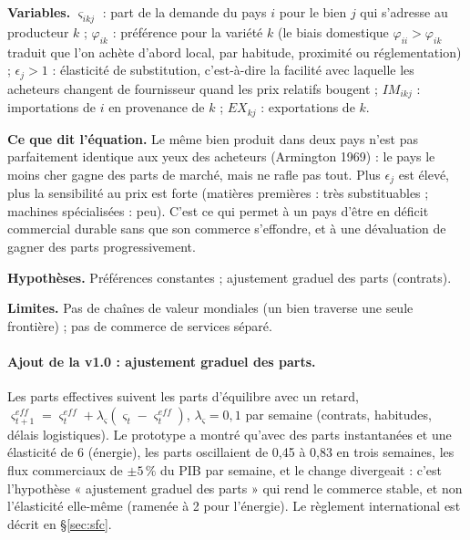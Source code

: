 \documentclass[11pt,a4paper]{article}
\newcommand{\variables}{\par\noindent\textbf{Variables.} }
\newcommand{\sens}{\par\noindent\textbf{Ce que dit l'équation.} }
\newcommand{\hyp}{\par\noindent\textbf{Hypothèses.} }
\newcommand{\limites}{\par\noindent\textbf{Limites.} }
\begin{document}
\begin{lecture}
\variables $\varsigma_{ikj}$ : part de la demande du pays $i$ pour le bien $j$ qui s'adresse au producteur $k$ ; $\varphi_{ik}$ : préférence pour la variété $k$ (le biais domestique $\varphi_{ii}>\varphi_{ik}$ traduit que l'on achète d'abord local, par habitude, proximité ou réglementation) ; $\epsilon_j>1$ : élasticité de substitution, c'est-à-dire la facilité avec laquelle les acheteurs changent de fournisseur quand les prix relatifs bougent ; $IM_{ikj}$ : importations de $i$ en provenance de $k$ ; $EX_{kj}$ : exportations de $k$.
\sens Le même bien produit dans deux pays n'est pas parfaitement identique aux yeux des acheteurs (Armington 1969) : le pays le moins cher gagne des parts de marché, mais ne rafle pas tout. Plus $\epsilon_j$ est élevé, plus la sensibilité au prix est forte (matières premières : très substituables ; machines spécialisées : peu). C'est ce qui permet à un pays d'être en déficit commercial durable sans que son commerce s'effondre, et à une dévaluation de gagner des parts progressivement.
\hyp Préférences constantes ; ajustement graduel des parts (contrats).
\limites Pas de chaînes de valeur mondiales (un bien traverse une seule frontière) ; pas de commerce de services séparé.
\paragraph{Ajout de la v1.0 : ajustement graduel des parts.} Les parts effectives suivent les parts d'équilibre avec un retard, $\varsigma^{eff}_{t+1}=\varsigma^{eff}_t+\lambda_\varsigma(\varsigma_t-\varsigma^{eff}_t)$, $\lambda_\varsigma=0{,}1$ par semaine (contrats, habitudes, délais logistiques). Le prototype a montré qu'avec des parts instantanées et une élasticité de 6 (énergie), les parts oscillaient de 0,45 à 0,83 en trois semaines, les flux commerciaux de $\pm5\,\%$ du PIB par semaine, et le change divergeait : c'est l'hypothèse « ajustement graduel des parts » qui rend le commerce stable, et non l'élasticité elle-même (ramenée à 2 pour l'énergie). Le règlement international est décrit en \S\ref{sec:sfc}.

\end{lecture}
\end{document}
